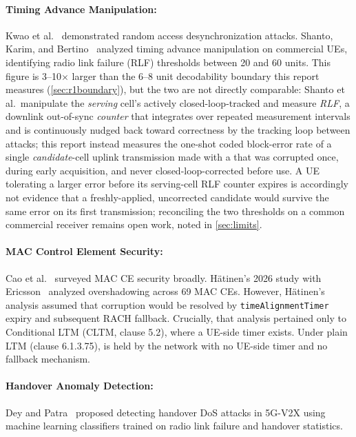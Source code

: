 \paragraph{Timing Advance Manipulation:}
\label{sec:lit-ta}
Kwao et al.~\cite{kwao2024random} demonstrated random access desynchronization attacks. Shanto, Karim,
and Bertino~\cite{shanto2026breaking} analyzed timing advance manipulation on commercial UEs, identifying
radio link failure (RLF) thresholds between 20 and 60 units. This figure is 3--10$\times$ larger than the
6--8 unit decodability boundary this report measures (\cref{sec:r1boundary}), but the two are not directly
comparable: Shanto et al.\ manipulate the \emph{serving} cell's actively closed-loop-tracked \TA{} and
measure \emph{RLF}, a downlink out-of-sync \emph{counter} that integrates over repeated measurement
intervals and is continuously nudged back toward correctness by the tracking loop between attacks; this
report instead measures the one-shot coded block-error rate of a single \emph{candidate}-cell uplink
transmission made with a \TA{} that was corrupted once, during early acquisition, and never
closed-loop-corrected before use. A UE tolerating a larger error before its serving-cell RLF counter
expires is accordingly not evidence that a freshly-applied, uncorrected candidate \TA{} would survive the
same error on its first transmission; reconciling the two thresholds on a common commercial receiver
remains open work, noted in \cref{sec:limits}.

\paragraph{MAC Control Element Security:}
Cao et al.~\cite{cao2025macce} surveyed MAC CE security broadly. Hätinen's 2026 study with
Ericsson~\cite{hatinen2026overshadowing} analyzed overshadowing across 69 MAC CEs. However, Hätinen's
analysis assumed that \TA{} corruption would be resolved by \texttt{timeAlignmentTimer} expiry and
subsequent RACH fallback. Crucially, that analysis pertained only to Conditional LTM (CLTM, clause
5.2), where a UE-side timer exists. Under plain LTM (clause 6.1.3.75), \TA{} is held by the network with
no UE-side timer and no fallback mechanism.

\paragraph{Handover Anomaly Detection:}
Dey and Patra~\cite{dey2025secure,dey2023handitover} proposed detecting handover DoS attacks in 5G-V2X
using machine learning classifiers trained on radio link failure and handover statistics.

